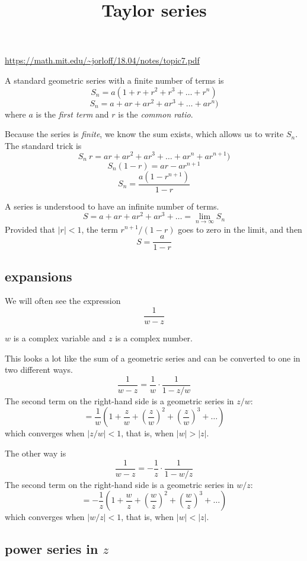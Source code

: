 \documentclass[11pt, oneside]{article}
\title{Taylor series}
\date{}
\begin{document}
\maketitle
\Large


\url{https://math.mit.edu/~jorloff/18.04/notes/topic7.pdf}

A standard geometric series with a finite number of terms is
\[ S_n = a(1 + r + r^2 + r^3 + \dots + r^n) \]
\[ S_n = a + ar + ar^2 + ar^3 + \dots + ar^n) \]
where $a$ is the \emph{first term} and $r$ is the \emph{common ratio}.

Because the series is \emph{finite}, we know the sum exists, which allows us to write $S_n$.  The standard trick is
\[ S_n \ r = ar + ar^2 + ar^3 + \dots + ar^n + ar^{n+1}) \]
\[ S_n (1 - r) = ar - ar^{n+1} \]
\[ S_n = \frac{a(1 - r^{n+1})}{1 - r} \]

A series is understood to have an infinite number of terms.
\[ S = a + ar + ar^2 + ar^3 + \dots = \lim_{n \rightarrow \infty} S_n \]
Provided that $|r| < 1$, the term $r^{n+1}/(1-r)$ goes to zero in the limit, and then
\[ S = \frac{a}{1-r} \]

\subsection*{expansions}
We will often see the expression 
\[ \frac{1}{w - z} \]

$w$ is a complex variable and $z$ is a complex number.

This looks a lot like the sum of a geometric series and can be converted to one in two different ways.
\[ \frac{1}{w - z} = \frac{1}{w} \cdot \frac{1}{1 - z/w} \]
The second term on the right-hand side is a geometric series in $z/w$:
\[ =  \frac{1}{w} (1 + \frac{z}{w} + (\frac{z}{w})^2 + (\frac{z}{w})^3 + \dots ) \]
which converges when $|z/w| < 1$, that is, when $|w| > |z|$.

The other way is
\[ \frac{1}{w - z} = -\frac{1}{z} \cdot \frac{1}{1 - w/z} \]
The second term on the right-hand side is a geometric series in $w/z$:
\[ =  -\frac{1}{z} (1 + \frac{w}{z} + (\frac{w}{z})^2 + (\frac{w}{z})^3 + \dots ) \]
which converges when $|w/z| < 1$, that is, when $|w| < |z|$.

\subsection*{power series in $z$}
\end{document}
